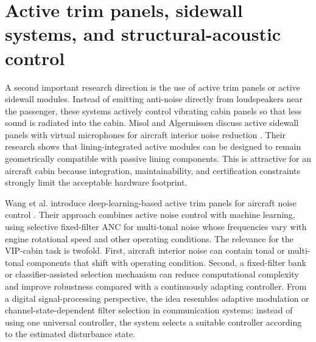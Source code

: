 \section{Active trim panels, sidewall systems, and structural-acoustic control}
\label{sec:active-panels}

A second important research direction is the use of active trim panels or active sidewall modules. Instead of emitting anti-noise directly from loudspeakers near the passenger, these systems actively control vibrating cabin panels so that less sound is radiated into the cabin. Misol and Algermissen discuss active sidewall panels with virtual microphones for aircraft interior noise reduction \cite{misol2020sidewall}. Their research shows that lining-integrated active modules can be designed to remain geometrically compatible with passive lining components. This is attractive for an aircraft cabin because integration, maintainability, and certification constraints strongly limit the acceptable hardware footprint.

Wang et al. introduce deep-learning-based active trim panels for aircraft noise control \cite{wang2025deep}. Their approach combines active noise control with machine learning, using selective fixed-filter ANC for multi-tonal noise whose frequencies vary with engine rotational speed and other operating conditions. The relevance for the VIP-cabin task is twofold. First, aircraft interior noise can contain tonal or multi-tonal components that shift with operating condition. Second, a fixed-filter bank or classifier-assisted selection mechanism can reduce computational complexity and improve robustness compared with a continuously adapting controller. From a digital signal-processing perspective, the idea resembles adaptive modulation or channel-state-dependent filter selection in communication systems: instead of using one universal controller, the system selects a suitable controller according to the estimated disturbance state.

